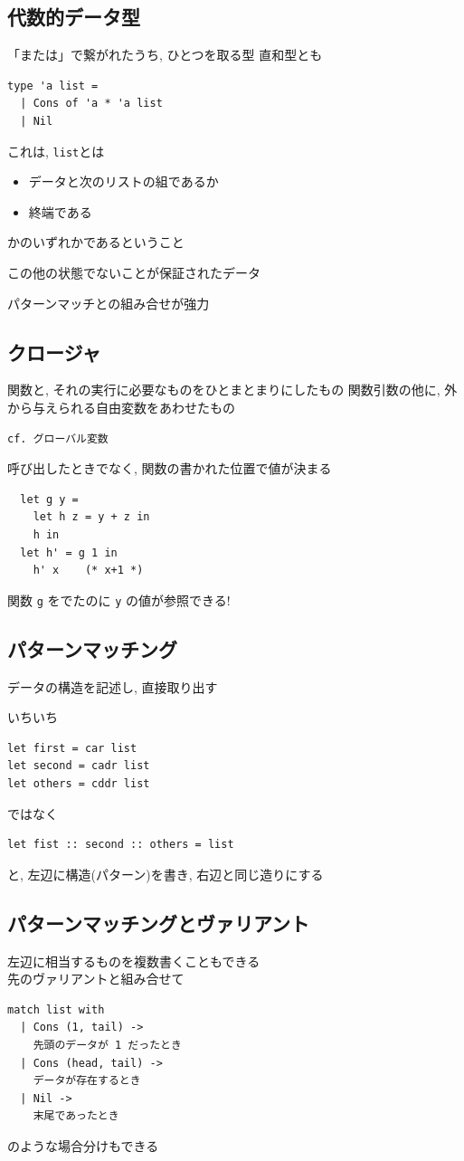 \documentclass[papersize,30pt,slide]{jsarticle}
\begin{document}
\subsection{代数的データ型}
「または」で繋がれたうち, ひとつを取る型 直和型とも

\begin{verbatim}
type 'a list =
  | Cons of 'a * 'a list
  | Nil
\end{verbatim}
これは, \verb|list|とは
\begin{itemize}
\item データと次のリストの組であるか
\item 終端である
\end{itemize}
かのいずれかであるということ

この他の状態でないことが保証されたデータ

パターンマッチとの組み合せが強力

\newpage
\subsection{クロージャ}
関数と, それの実行に必要なものをひとまとまりにしたもの
関数引数の他に, 外から与えられる自由変数をあわせたもの

\begin{verbatim}
cf. グローバル変数
\end{verbatim}
呼び出したときでなく, 関数の書かれた位置で値が決まる

\begin{verbatim}
  let g y =
    let h z = y + z in
    h in
  let h' = g 1 in
    h' x    (* x+1 *)
\end{verbatim}
関数 \verb|g| をでたのに \verb|y| の値が参照できる!

\newpage
\subsection{パターンマッチング}
データの構造を記述し, 直接取り出す

いちいち
\begin{verbatim}
let first = car list
let second = cadr list
let others = cddr list
\end{verbatim}
ではなく
\begin{verbatim}
let fist :: second :: others = list
\end{verbatim}
と, 左辺に構造(パターン)を書き, 右辺と同じ造りにする

\newpage
\subsection{パターンマッチングとヴァリアント}
左辺に相当するものを複数書くこともできる \\
先のヴァリアントと組み合せて\vspace{-0.9em}
\begin{verbatim}
match list with
  | Cons (1, tail) ->
    先頭のデータが 1 だったとき
  | Cons (head, tail) ->
    データが存在するとき
  | Nil ->
    末尾であったとき
\end{verbatim} \vspace{-0.8em}
のような場合分けもできる
\end{document}
